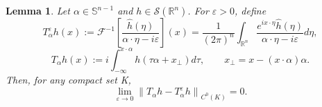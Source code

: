 \documentclass[12pt,a4paper]{amsart}
\numberwithin{equation}{section}
\theoremstyle{plain}
\newtheorem{lemma}[theorem]{Lemma}
\theoremstyle{definition}
\begin{document}
\begin{lemma}\label{lem:transport}
Let $\alpha\in\mathbb{S}^{n-1}$ and $h\in \mathscr{S}(\mathbb{R}^n)$.
For $\varepsilon>0$, define
\begin{equation*}
    T_\alpha^\varepsilon h(x)
  :=
  \mathcal{F}^{-1}\left[\frac{\widehat{h}(\eta)}{\alpha\cdot\eta-i\varepsilon}\right](x)
  = \frac{1}{(2\pi)^n}\int_{\mathbb{R}^n}
    \frac{e^{ix\cdot\eta}\widehat{h}(\eta)}{\alpha\cdot\eta-i\varepsilon}d\eta,
\end{equation*}
\begin{equation*}
    T_\alpha h(x)
    :=
    i\int_{-\infty}^{x\cdot\alpha} h(\tau\alpha+x_\perp)d\tau,
  \qquad x_\perp = x-(x\cdot\alpha)\alpha.
\end{equation*}
Then, for any compact set K,
\begin{equation*}
    \lim_{\varepsilon\to 0} \left\|T_{\alpha} h
    -
    T_{\alpha}^\varepsilon h 
    \right\|_{C^0(K)} =0.
\end{equation*}
\end{lemma}
\end{document}
